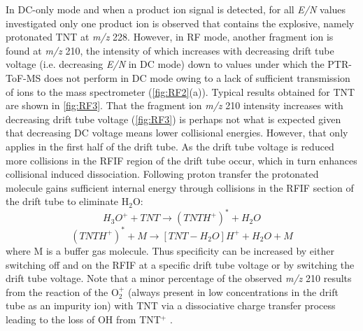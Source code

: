 In DC-only mode and when a product ion signal is detected, for all \textit{E/N} values investigated only one product ion is observed that contains the explosive, namely protonated TNT at \textit{m/z} 228. However, in RF mode, another fragment ion is found at \textit{m/z} 210, the intensity of which increases with decreasing drift tube voltage (i.e. decreasing \textit{E/N} in DC mode) down to values under which the PTR-ToF-MS does not perform in DC mode owing to a lack of sufficient transmission of ions to the mass spectrometer (\autoref{fig:RF2}(a)). Typical results obtained for TNT are shown in \autoref{fig:RF3}. That the fragment ion \textit{m/z} 210 intensity increases with decreasing drift tube voltage (\autoref{fig:RF3}) is perhaps not what is expected given that decreasing DC voltage means lower collisional energies. However, that only applies in the first half of the drift tube. As the drift tube voltage is reduced more collisions in the RFIF region of the drift tube occur, which in turn enhances collisional induced dissociation. Following proton transfer the protonated molecule gains sufficient internal energy
through collisions in the RFIF section of the drift tube to eliminate H$_2$O:
\begin{equation}
    H_3O^+ + TNT \rightarrow (TNTH^+)^* + H_2O
    \label{eq:rf1}
\end{equation}
\begin{equation}
     (TNTH^+)^* + M \rightarrow [TNT-H_2O]H^+ + H_2O + M
    \label{eq:rf2}
\end{equation}
where M is a buffer gas molecule. Thus specificity can be increased by either switching off and on the RFIF at a specific drift tube voltage or by switching the drift tube voltage. Note that a minor percentage of the observed \textit{m/z} 210 results from the reaction of the O$_2^+$ (always present in low concentrations in the drift tube as an impurity ion) with TNT via a dissociative charge transfer process leading to the loss of OH from TNT$^+$ \cite{sulzer2013applications}. 

